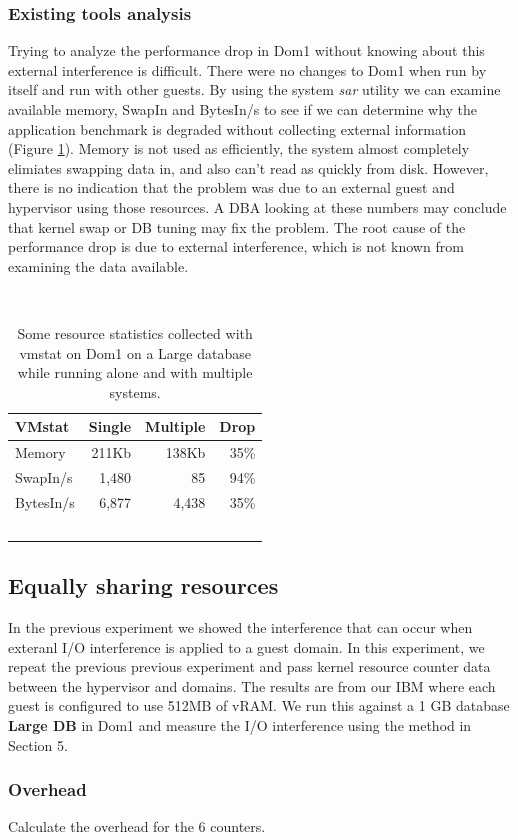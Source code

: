 \subsubsection{Existing tools analysis}
\indent Trying to analyze the performance drop in Dom1 without knowing about this external interference is difficult.  
There were no changes to Dom1 when run by itself and run with other guests.  
By using the system \emph{sar} utility we can examine available memory, SwapIn and BytesIn/s to see if we can determine why the application benchmark is degraded without collecting external information (Figure \ref{fig:vmstat}).  
Memory is not used as efficiently, the system almost completely elimiates swapping data in, and also can't read as quickly from disk.  
However, there is no indication that the problem was due to an external guest and hypervisor using those resources.
A DBA looking at these numbers may conclude that kernel swap or DB tuning may fix the problem.  
The root cause of the performance drop is due to external interference, which is not known from examining the data available.
\begin{table}[h]
  \begin{tabular}{ l | r | r | r }
    VMstat & Single & Multiple & Drop \\ \hline
	Memory & 211Kb & 138Kb & 35\% \\
	SwapIn/s & 1,480 & 85 & 94\% \\
	BytesIn/s & 6,877 & 4,438 & 35\% \\
  \end{tabular}
\caption{Some resource statistics collected with vmstat on Dom1 on a Large database while running alone and with multiple systems.} 
\label{fig:vmstat}
\end{table}

\subsection{Equally sharing resources}
In the previous experiment we showed the interference that can occur when exteranl I/O interference is applied to a guest domain.
In this experiment, we repeat the previous previous experiment and pass kernel resource counter data between the hypervisor and domains.  
The results are from our IBM where each guest is configured to use 512MB of vRAM.
We run this against a 1 GB database \textbf{Large DB} in Dom1 and measure the I/O interference using the method in Section 5.  

\subsubsection{Overhead}
Calculate the overhead for the 6 counters.

